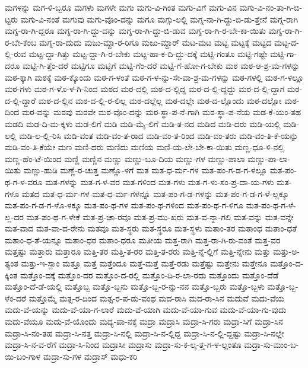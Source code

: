 {ಮಗಳನ್ನು
ಮಗ-ಳಿ-ಬ್ಬರೂ
ಮಗಳು
ಮಗಳೇ
ಮಗು
ಮಗು-ವಿ-ಗಿಂತ
ಮಗು-ವಿಗೆ
ಮಗು-ವಿನ
ಮಗು-ವಿ-ನಂ-ತಾ-ಗಿ-ಬಿ-ಟ್ಟರು
ಮಗು-ವಿ-ನಂತೆ
ಮಗುವು
ಮಗು-ವೊಂ-ದನ್ನು
ಮಗೂ
ಮಗ್ಗು-ಲಲ್ಲಿ
ಮಗ್ನ-ನಾ-ಗಿ-ದ್ದು-ಬಿ-ಡು-ತ್ತೇನೆ
ಮಗ್ನ-ರಾಗಿ
ಮಗ್ನ-ರಾ-ಗಿ-ದ್ದರೂ
ಮಗ್ನ-ರಾ-ಗಿ-ದ್ದು-ದನ್ನು
ಮಗ್ನ-ರಾ-ಗಿ-ದ್ದು-ಬಿ-ಡುವ
ಮಗ್ನ-ರಾ-ಗಿ-ರ-ಬೇ-ಕಾ-ಯಿತು
ಮಗ್ನ-ರಾ-ಗಿ-ರ-ಬೇ-ಕೆಂಬ
ಮಗ್ನ-ರಾ-ದುದು
ಮಜು-ಮ್ದಾ-ರ-ರಿಗೂ
ಮಜು-ಮ್ದಾರ್
ಮಟ-ಮಟ
ಮಟ್ಟ
ಮಟ್ಟಕ್ಕೆ
ಮಟ್ಟದ
ಮಟ್ಟ-ದ-ಲ್ಲಿ-ರುವ
ಮಟ್ಟ-ದ್ದಾ-ಗಿತ್ತು
ಮಟ್ಟ-ದ್ದಾ-ಗಿ-ರ-ಬೇಕು
ಮಟ್ಟ-ಹಾ-ಕ-ದಿ-ದ್ದು-ದಕ್ಕೆ
ಮಟ್ಟಿ-ಗಂತೂ
ಮಟ್ಟಿ-ಗಷ್ಟೇ
ಮಟ್ಟಿ-ಗಾ-ದರೂ
ಮಟ್ಟಿ-ಗಿ-ತ್ತೆಂ-ದರೆ
ಮಟ್ಟಿಗೂ
ಮಟ್ಟಿಗೆ
ಮಟ್ಟಿ-ಗೆಂ-ದರೆ
ಮಟ್ಟಿ-ಗೆ-ಹೋ-ಗ-ಬೇಕು
ಮಠ
ಮಠ-ಆ-ಶ್ರ-ಮ-ಗಳನ್ನು
ಮಠ-ಕ್ಕಾಗಿ
ಮಠಕ್ಕೆ
ಮಠ-ಕ್ಕೊಂದು
ಮಠ-ಗ-ಳಂತೆ
ಮಠ-ಗ-ಳ-ನ್ನು-ಸೇ-ವಾ-ಶ್ರ-ಮ-ಗಳನ್ನು
ಮಠ-ಗಳಲ್ಲಿ
ಮಠ-ಗ-ಳಲ್ಲೂ
ಮಠ-ಗಳು
ಮಠ-ಗ-ಳೊ-ಳ-ಗಿ-ನಿಂದ
ಮಠದ
ಮಠ-ದಲ್ಲಿ
ಮಠ-ದ-ಲ್ಲಿದ್ದ
ಮಠ-ದ-ಲ್ಲಿ-ದ್ದದ್ದು
ಮಠ-ದ-ಲ್ಲಿ-ದ್ದಾಗ
ಮಠ-ದ-ಲ್ಲಿ-ದ್ದಾರೆ
ಮಠ-ದ-ಲ್ಲಿನ
ಮಠ-ದ-ಲ್ಲಿ-ರ-ಲಿಲ್ಲ
ಮಠ-ದಲ್ಲೆಲ್ಲ
ಮಠ-ದಲ್ಲೇ
ಮಠ-ದ-ಲ್ಲೊಂದು
ಮಠ-ದಲ್ಲೋ
ಮಠ-ದಿಂದ
ಮಠ-ವನ್ನು
ಮಠವು
ಮಠವೇ
ಮಠ-ವೊಂ-ದನ್ನು
ಮಠ-ಸ್ಥಾ-ಪ-ನೆ-ಗಾಗಿ
ಮಠ-ಸ್ಥಾ-ಪ-ನೆಯ
ಮಡ-ಕೆ-ಯಂ-ತಹ
ಮಡದಿ
ಮಡ-ದಿ-ಮ-ಕ್ಕಳು
ಮಡ-ಲಿಗೆ
ಮಡಿ
ಮಡಿ-ಮೈ-ಲಿಗೆ
ಮಡಿ-ತ-ನದ
ಮಡಿದ
ಮಡಿ-ದರು
ಮಡಿ-ಯಲ್ಲಿ
ಮಡಿ-ಲಲ್ಲಿ
ಮಡಿ-ಲ-ಲ್ಲಿ-ರಿಸಿ
ಮಡಿ-ವಂತ
ಮಡಿ-ವಂ-ತ-ರಾದ
ಮಡಿ-ವಂ-ತ-ರಿಂದ
ಮಡಿ-ವಂ-ತರು
ಮಡಿ-ವಂ-ತಿ-ಕೆ-ಯನ್ನು
ಮಡಿ-ವಂ-ತಿ-ಕೆಯೇ
ಮಣ
ಮಣಿ-ದರು
ಮಣಿದು
ಮಣಿಯ
ಮಣಿ-ಯ-ಲೇ-ಬೇ-ಕಾ-ಯಿತು
ಮಣ್ಣ-ಧೂ-ಳಿ-ನಲ್ಲಿ
ಮಣ್ಣ-ಹೆಂ-ಟೆ-ಯಿಂದ
ಮಣ್ಣಿ
ಮಣ್ಣಿನ
ಮಣ್ಣು
ಮಣ್ಣು-ಬೂ-ದಿಯ
ಮಣ್ಣು-ಗಳ
ಮಣ್ಣು-ಪಾಲಾ
ಮಣ್ಣು-ಪಾ-ಲಾ-ಯಿತು
ಮಣ್ಣು-ಹುಡಿ
ಮಣ್ಣೆ-ರ-ಚುತ್ತ
ಮಣ್ಣೊ-ಳಗೆ
ಮತ
ಮತ-ಧ-ರ್ಮ-ಗಳ
ಮತ-ಪಂ-ಗ-ಡ-ಗ-ಳಲ್ಲೂ
ಮತ-ಪಂ-ಥ-ಗ-ಳ-ವರೂ
ಮತ-ಗಳನ್ನು
ಮತ-ಗ-ಳ-ವರ
ಮತ-ಗಳಿಂದ
ಮತ-ಗಳು
ಮತ-ಗ-ಳು-ಸಂ-ಪ್ರ-ದಾ-ಯ-ಗಳು
ಮತ-ಗಳೂ
ಮತದ
ಮತ-ಧ-ರ್ಮ-ಗಳ
ಮತ-ಧ-ರ್ಮ-ಗಳನ್ನೂ
ಮತ-ಪಂ-ಗ-ಡ-ಗಳನ್ನು
ಮತ-ಪಂ-ಗ-ಡ-ಗ-ಳೆ-ಲ್ಲಕ್ಕೂ
ಮತ-ಪಂ-ಗ-ಡ-ಗ-ಳೊ-ಳಕ್ಕೂ
ಮತ-ಪಂ-ಥ-ಗಳ
ಮತ-ಪಂ-ಥ-ಗಳಿಂದ
ಮತ-ಪಂ-ಥ-ಗ-ಳಿಗೂ
ಮತ-ಪಂ-ಥ-ಗ-ಳೆ-ಲ್ಲ-ದರ
ಮತ-ಪಂ-ಥ-ಗ-ಳೇಕೆ
ಮತ-ಪ್ರ-ಚಾ-ರವೂ
ಮತ-ಪ್ರ-ಮು-ಖರು
ಮತ-ವ-ನ್ನಾ-ಗಲಿ
ಮತ-ವನ್ನು
ಮತ-ವನ್ನೇ
ಮತ-ವಾದ
ಮತ-ವಾ-ದ-ರೇನು
ಮತವೂ
ಮತ-ಸ್ಥರು
ಮತ-ಸ್ಥರೂ
ಮತ-ಸ್ಥಳು
ಮತಾಂ-ತರ
ಮತಾಂಧ
ಮತಾಂ-ಧತೆ
ಮತಾಂ-ಧ-ತೆ-ಯನ್ನೂ
ಮತಾಂ-ಧರ
ಮತಾಂ-ಧರೂ
ಮತೀಯ
ಮತ್ತ-ರಾಗಿ
ಮತ್ತ-ರಾ-ಗಿ-ರು-ವಂತೆ
ಮತ್ತ-ವರ
ಮತ್ತಷ್ಟು
ಮತ್ತಾರು
ಮತ್ತಾರೂ
ಮತ್ತಿ-ತರ
ಮತ್ತಿ-ತ-ರರ
ಮತ್ತಿ-ತ-ರರು
ಮತ್ತಿ-ನ್ನೆ-ಲ್ಲಿಗೆ
ಮತ್ತಿ-ನ್ನೇನು
ಮತ್ತು
ಮತ್ತು-ಅ-ತ್ಯಂತ
ಮತ್ತು-ಇ-ಸ್ಲಾಂ
ಮತ್ತೂ
ಮತ್ತೆ
ಮತ್ತೆಂದೂ
ಮತ್ತೆ-ಮತ್ತೆ
ಮತ್ತೆ-ರಡು
ಮತ್ತೆಷ್ಟು
ಮತ್ತೇನು
ಮತ್ತೇನೂ
ಮತ್ತೊಂ-ದ-ಕ್ಕಿಂತ
ಮತ್ತೊಂ-ದಕ್ಕೆ
ಮತ್ತೊಂ-ದರ
ಮತ್ತೊಂ-ದ-ರಲ್ಲಿ
ಮತ್ತೊಂ-ದಿ-ರ-ಲಾ-ರದು
ಮತ್ತೊಂದು
ಮತ್ತೊಂ-ದೆಡೆ
ಮತ್ತೊಂ-ದೆ-ಡೆ-ಯಲ್ಲಿ
ಮತ್ತೊಬ್ಬ
ಮತ್ತೊ-ಬ್ಬನು
ಮತ್ತೊ-ಬ್ಬ-ರ-ನ್ನು-ನನ
ಮತ್ತೊ-ಬ್ಬರು
ಮತ್ತೊ-ಬ್ಬಳು
ಮತ್ತೊ-ಬ್ಬ-ಳೆಂ-ದರೆ
ಮತ್ತೊಮ್ಮೆ
ಮತ್ಸ-ರ-ದಿಂದ
ಮತ್ಸ-ರ-ಪ-ಡು-ವಂಥ
ಮದ-ರಾಸಿ
ಮದ-ರಾ-ಸಿನ
ಮದುವೆ
ಮದು-ವೆಯ
ಮದು-ವೆ-ಯನ್ನು
ಮದು-ವೆ-ಯಾ-ಗ-ಲಾರೆ
ಮದು-ವೆ-ಯಾಗಿ
ಮದು-ವೆ-ಯಾ-ಗುವ
ಮದು-ವೆ-ಯಾ-ಗು-ವುದು
ಮದು-ವೆಯೂ
ಮದು-ವೆ-ಯೊಂದು
ಮದ್ಯ-ಪಾ-ನಕ್ಕೆ
ಮದ್ರಾ
ಮದ್ರಾಸಿ
ಮದ್ರಾ-ಸಿ-ಗರು
ಮದ್ರಾ-ಸಿಗೆ
ಮದ್ರಾ-ಸಿನ
ಮದ್ರಾ-ಸಿ-ನಂ-ತಹ
ಮದ್ರಾ-ಸಿ-ನತ್ತ
ಮದ್ರಾ-ಸಿ-ನಲ್ಲಿ
ಮದ್ರಾ-ಸಿ-ನ-ಲ್ಲಿದ್ದ
ಮದ್ರಾ-ಸಿ-ನ-ಲ್ಲಿ-ದ್ದಷ್ಟು
ಮದ್ರಾ-ಸಿ-ನಲ್ಲೇ
ಮದ್ರಾ-ಸಿ-ನ-ವ-ರೆಗೆ
ಮದ್ರಾ-ಸಿ-ನಿಂದ
ಮದ್ರಾಸೀ
ಮದ್ರಾಸು
ಮದ್ರಾ-ಸು-ಕ-ಲ್ಕ-ತ್ತ-ಗ-ಳ-ಲ್ಲಂತೂ
ಮದ್ರಾ-ಸು-ಮುಂ-ಬ-ಯಿ-ಬಂ-ಗಾಳ
ಮದ್ರಾ-ಸು-ಗಳ
ಮದ್ರಾಸ್
ಮಧು-ಕರಿ
}

